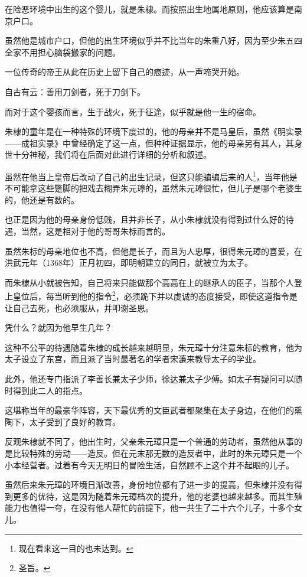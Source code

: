 \begin{multicols}{\theparacolNo}
		在险恶环境中出生的这个婴儿，就是朱棣。而按照出生地属地原则，他应该算是南京户口。

		虽然他是城市户口，但他的出生环境似乎并不比当年的朱重八好，因为至少朱五四全家不用担心脑袋搬家的问题。

		一位传奇的帝王从此在历史上留下自己的痕迹，从一声啼哭开始。

		自古有云：善用刀剑者，死于刀剑下。

		而对于这个婴孩而言，生于战火，死于征途，似乎就是他一生的宿命。

		朱棣的童年是在一种特殊的环境下度过的，他的母亲并不是马皇后，虽然《明实录——成祖实录》中曾经确定了这一点，但种种证据显示，他的母亲另有其人，其身世十分神秘，我们将在后面对此进行详细的分析和叙述。

		虽然在他当上皇帝后改动了自己的出生记录，但这只能骗骗后来的人\footnote{现在看来这一目的也未达到。}，当年他是不可能拿这些蹩脚的把戏去糊弄朱元璋的，虽然朱元璋很忙，但儿子是哪个老婆生的，他还是有数的。

		也正是因为他的母亲身份低贱，且并非长子，从小朱棣就没有得到过什么好的待遇，当然，这是相对于他的哥哥朱标而言的。

		虽然朱标的母亲地位也不高，但他是长子，而且为人忠厚，很得朱元璋的喜爱，在洪武元年（1368年）正月初四，即明朝建立的同日，就被立为太子。

		而朱棣从小就被告知，自己将来只能做那个高高在上的继承人的臣子，当那个人登上皇位后，每当听到他的指令\footnote{圣旨。}，必须跪下并以虔诚的态度接受，即使这道指令是让自己去死，也必须服从，并叩谢圣恩。

		凭什么？就因为他早生几年？

		这种不公平的待遇随着朱棣的成长越来越明显，朱元璋十分注意朱标的教育，他为太子设立了东宫，而且派了当时最著名的学者宋濂来教导太子的学业。

		此外，他还专门指派了李善长兼太子少师，徐达兼太子少傅。如太子有疑问可以随时得到此二人的指点。

		这堪称当年的最豪华阵容，天下最优秀的文臣武者都聚集在太子身边，在他们的熏陶下，太子受到了良好的教育。

		反观朱棣就不同了，他出生时，父亲朱元璋只是一个普通的劳动者，虽然他从事的是比较特殊的劳动——造反。但在元末那无数的造反者中，此时的朱元璋只是一个小本经营者。过着有今天无明日的冒险生活，自然顾不上这个并不起眼的儿子。

		虽然后来朱元璋的环境日渐改善，身份地位都有了进一步的提高，但朱棣并没有得到更多的优待，这是因为随着朱元璋档次的提升，他的老婆也越来越多。而其生殖能力也值得一夸，在没有他人帮忙的前提下，他一共生了二十六个儿子，十多个女儿。


\end{multicols}
